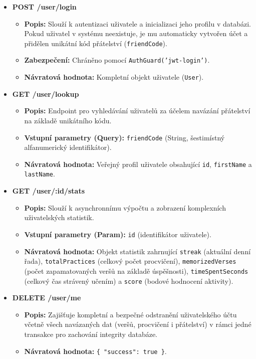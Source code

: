 \documentclass[12pt, a4paper, oneside]{article}
\begin{document}
	\begin{itemize}
		\item \textbf{POST /user/login}
		\begin{itemize}
			\item \textbf{Popis:} Slouží k autentizaci uživatele a inicializaci jeho profilu v databázi. Pokud uživatel v systému neexistuje, je mu automaticky vytvořen účet a přidělen unikátní kód přátelství (\texttt{friendCode}).
			\item \textbf{Zabezpečení:} Chráněno pomocí \texttt{AuthGuard('jwt-login')}.
			\item \textbf{Návratová hodnota:} Kompletní objekt uživatele (\texttt{User}).
		\end{itemize}
		
		\item \textbf{GET /user/lookup}
		\begin{itemize}
			\item \textbf{Popis:} Endpoint pro vyhledávání uživatelů za účelem navázání přátelství na základě unikátního kódu.
			\item \textbf{Vstupní parametry (Query):} \texttt{friendCode} (String, šestimístný alfanumerický identifikátor).
			\item \textbf{Návratová hodnota:} Veřejný profil uživatele obsahující \texttt{id}, \texttt{firstName} a \texttt{lastName}.
		\end{itemize}
		
		\item \textbf{GET /user/:id/stats}
		\begin{itemize}
			\item \textbf{Popis:} Slouží k asynchronnímu výpočtu a zobrazení komplexních uživatelských statistik.
			\item \textbf{Vstupní parametry (Param):} \texttt{id} (identifikátor uživatele).
			\item \textbf{Návratová hodnota:} Objekt statistik zahrnující \texttt{streak} (aktuální denní řada), \texttt{totalPractices} (celkový počet procvičení), \texttt{memorizedVerses} (počet zapamatovaných veršů na základě úspěšnosti), \texttt{timeSpentSeconds} (celkový čas strávený učením) a \texttt{score} (bodové hodnocení aktivity).
		\end{itemize}
		
		\item \textbf{DELETE /user/me}
		\begin{itemize}
			\item \textbf{Popis:} Zajišťuje kompletní a bezpečné odstranění uživatelského účtu včetně všech navázaných dat (veršů, procvičení i přátelství) v rámci jedné transakce pro zachování integrity databáze.
			\item \textbf{Návratová hodnota:} \texttt{\{ "success": true \}}.
		\end{itemize}
	\end{itemize}
	
\end{document}
